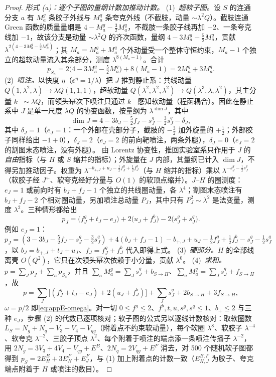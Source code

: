 \begin{proof}
\emph{形式 (a)：逐个子图的量纲计数加推动计数。}
(1)~\emph{超软子图。}设 $S$ 的连通分支 $a$ 有 $M^g_a$ 条胶子外线与 $M^q_a$ 条夸克外线（不截肢，动量 $\sim\lambda^2Q$）。截肢连通 Green 函数的质量量纲是 $4-M^g_a-\frac32M^q_a$，不截肢一条胶子线再加 $-2$、一条夸克线加 $-1$，故该分支是动量 $\sim\lambda^2Q$ 的齐次函数，量纲 $4-3M^g_a-\frac52M^q_a$，贡献 $\lambda^{2(4-3M^g_a-\frac52M^q_a)}$；其 $M_a=M^g_a+M^q_a$ 个外动量受一个整体守恒约束，$M_a-1$ 个独立的超软动量流入其余部分，测度 $\lambda^{8(M_a-1)}$。合计
\[
p_{S_a}=2\big(4-3M^g_a-\tfrac52M^q_a\big)+8(M_a-1)=2M^g_a+3M^q_a .
\]
(2)~\emph{喷注。}以快度 $\eta$（$\ee^\eta=1/\lambda$）把 $J$ 推到静止系：共线动量 $Q(1,\lambda^2,\lambda)\to\lambda Q(1,1,1)$，超软动量 $Q(\lambda^2,\lambda^2,\lambda^2)\to Q(\lambda^3,\lambda,\lambda^2)$，其主分量 $k^-\sim\lambda Q$，而领头幂次下喷注只通过 $k^-$ 感知软动量（程函耦合）。因此在静止系中 $J$ 是单一尺度 $\lambda Q$ 的协变函数，按量纲为 $\lambda^{\dim J}$，其中
\[
\dim J=4-3b_J-\tfrac52f_J-s^g_J-\tfrac32s^q_J-\delta_J ,
\]
其中 $\delta_J=1$（$e_J=1$：一个外部在壳部分子，截肢的 $-\frac32$ 加外旋量的 $+\frac12$；外部胶子同样给出 $-1+0$），$\delta_J=2$（$e_J=2$ 的前向靶喷注，两条外腿），$\delta_J=0$（$e_J=2$ 的割图末态喷注，没有外腿）。
由 Lorentz 协变性，推回实验室系只作用于 $J$ 的\emph{自由}指标（与 $H$ 或 $S$ 缩并的指标）；外旋量在 $J$ 内部，其量纲已计入 $\dim J$，不得另加推动因子。权重为 $\lambda^{-b_{+,J}+u_J-\frac12f^g_J+\frac12f^b_J}$（与 $H$ 缩并的指标）乘以 $\lambda^{-s^g_J-\frac12s^q_J}$（软胶子经 $J^+$、软夸克经好分量与 $O(1)$ 的软顶点缩并）。$J$--$H$ 的圈测度：$e_J=1$ 或前向时有 $b_J+f_J-1$ 个独立的共线圈动量，各 $\lambda^4$；割图末态喷注有 $b_J+f_J-2$ 个相对圈动量，另加喷注总动量 $P_J$，其中只有 $P_J^2\sim\lambda^2$ 是法变量，测度 $\lambda^2$。三种情形都给出
\[
p_J=\big(f^g_J+t_J-e_J\big)+2\big(u_J+f^b_J\big)-2\big(s^g_J+s^q_J\big).
\]
例如 $e_J=1$：$p_J=(3-3b_J-\frac52f_J-s^g_J-\frac32s^q_J)+4(b_J+f_J-1)-b_{+,J}+u_J-\frac12f^g_J+\frac12f^b_J-s^g_J-\frac12s^q_J$，以 $b_J=b_{+,J}+t_J+u_J$、$f_J=f^g_J+f^b_J$ 代入即得上式。
(3)~\emph{硬部分。}$H$ 的全部线离壳 $O(Q^2)$，它只在次领头幂次依赖于小分量，贡献 $\lambda^0$。
(4)~\emph{求和。}$p=\sum_Jp_J+\sum_ap_{S_a}$，并且 $\sum_aM^g_a=\sum_Js^g_J+b_{S\to H}$、$\sum_aM^q_a=\sum_Js^q_J+f_{S\to H}$，故
\[
p=\sum_J\big[(f^g_J+t_J-e_J)+2(u_J+f^b_J)\big]+\sum_Js^q_J+2b_{S\to H}+3f_{S\to H},
\]
$\omega=p/2$ 即\cref{eq:appE-omega}。对一切 $0\le f^g\le2$、$f^b,t,u,s^g,s^q\le1$、$b_+\le2$ 与三种 $e_J$，步骤 (2) 的代数已逐项核对；软子图的公式另以逐线计数核对：取软圈数 $L_S=N_g+N_q-V_3-V_4-V_{qg}$（附着点不约束软动量），每个软圈 $\lambda^8$、软胶子 $\lambda^{-4}$、软夸克 $\lambda^{-2}$、三胶子顶点 $\lambda^2$、每个附着于喷注的端点添一条喷注传播子 $\lambda^{-2}$，用 $2N_g=3V_3+4V_4+V_{qg}+E^B$、$2N_q=2V_{qg}+E^F$ 消去，对 500 个随机软子图都得到 $p_S=2E^B_H+3E^F_H+E^F_J$，与 (1) 加上附着点的计数一致（$E^{B,F}_{H,J}$ 为胶子、夸克端点附着于 $H$ 或喷注的数目）。


\end{proof}
